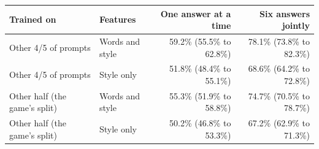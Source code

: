 \begin{tabular}{llrr}
\toprule
Trained on & Features & One answer at a time & Six answers jointly \\
\midrule
Other 4/5 of prompts & Words and style & 59.2\% (55.5\% to 62.8\%) & 78.1\% (73.8\% to 82.3\%) \\
Other 4/5 of prompts & Style only & 51.8\% (48.4\% to 55.1\%) & 68.6\% (64.2\% to 72.8\%) \\
\addlinespace
Other half (the game's split) & Words and style & 55.3\% (51.9\% to 58.8\%) & 74.7\% (70.5\% to 78.7\%) \\
Other half (the game's split) & Style only & 50.2\% (46.8\% to 53.3\%) & 67.2\% (62.9\% to 71.3\%) \\
\bottomrule
\end{tabular}
